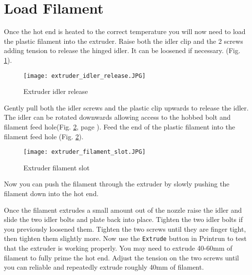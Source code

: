 \section{Load Filament}

Once the hot end is heated to the correct temperature you will now need to load the plastic filament into the extruder. Raise both the idler clip and the 2 screws adding tension to release the hinged idler. It can be loosened if necessary.
(Fig. \ref{fig:extruder_idler_release}).
\begin{figure}[hbt]
\centering
\texttt{[image: extruder\_idler\_release.JPG]}
\caption{Extruder idler release}
\label{fig:extruder_idler_release}
\end{figure}
Gently pull both the idler screws and the plastic clip upwards to release the idler. The idler can be rotated downwards allowing access to the hobbed bolt and filament feed hole(Fig. \ref{fig:extruder_filament_slot}, page \pageref{fig:extruder_filament_slot}). Feed the end of the plastic filament into the filament feed hole
(Fig. \ref{fig:extruder_filament_slot}).
\begin{figure}[hbt]
\centering
\texttt{[image: extruder\_filament\_slot.JPG]}
\caption{Extruder filament slot}
\label{fig:extruder_filament_slot}
\end{figure}
Now you can push the filament through the extruder by slowly pushing the filament down into the hot end.

Once the filament extrudes a small amount out of the nozzle raise the idler and slide the two idler bolts and plate back into place. Tighten the two idler bolts if you previously loosened them. Tighten the two screws until they are finger tight, then tighten them slightly more. Now use the \texttt{Extrude} button in Printrun to test that the extruder is working properly. You may need to extrude 40-60mm of filament to fully prime the hot end. Adjust the tension on the two screws until you can reliable and repeatedly extrude roughly 40mm of filament.

